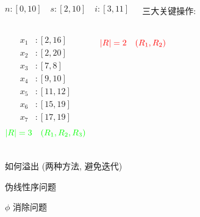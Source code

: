 \begin{frame}{}
	\begin{columns}
			\[
				n: [0, 10] \quad s: [2, 10] \quad i: [3, 11]
			\]

			\vspace{0.60cm}
			\begin{center}

				\vspace{0.30cm}
				三大关键操作: 
			\end{center}
	\end{columns}
\end{frame}

\begin{frame}{}
	\begin{columns}
		\column{0.50\textwidth}
			\begin{align*}
				x_{1}&: [2, 16] \\[3pt]
				x_{2}&: [2, 20] \\[3pt]
				x_{3}&: [7, 8] \\[3pt]
				x_{4}&: [9, 10] \\[3pt]
				x_{5}&: [11, 12] \\[3pt]
				x_{6}&: [15, 19] \\[3pt]
				x_{7}&: [17, 19]
			\end{align*}
		\column{0.50\textwidth}
			\pause
			\[
				\textcolor{green}{|R| = 3 \quad (R_{1}, R_{2}, R_{3})}
			\]

			\vspace{6.00cm}
			\[
				\textcolor{red}{|R| = 2 \quad (R_{1}, R_{2})}
			\]
	\end{columns}
\end{frame}

\begin{frame}{}
	如何溢出 (两种方法, 避免迭代)
\end{frame}

\begin{frame}{}
	伪线性序问题
\end{frame}

\begin{frame}{}
	$\phi$ 消除问题
\end{frame}
